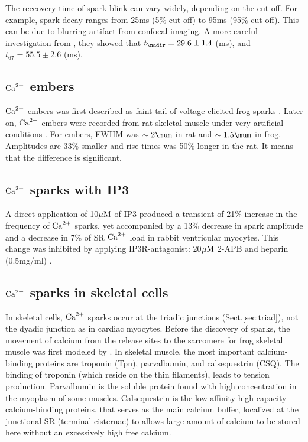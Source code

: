 The receovery time of spark-blink can vary widely, depending on the
cut-off. For example, spark decay ranges from 25ms (5\% cut off) to 95ms (95\%
cut-off). This can be due to blurring artifact from confocal imaging. A more
careful investigation from \citep{brochet2011}, they showed that
$t_\nadir=29.6\pm 1.4$ (ms), and $t_{67}=55.5\pm 2.6$ (ms).

\subsection{${\text{Ca}^{2+}}$ embers}

${\text{Ca}^{2+}}$ embers was first described as faint tail of voltage-elicited frog sparks
\citep{gonzalez2000}. Later on, ${\text{Ca}^{2+}}$ embers were recorded from rat skeletal
muscle under very artificial conditions \citep{zhou2003}.  For embers, FWHM was
$\sim 2\mum$ in rat and $\sim 1.5\mum$ in frog. Amplitudes are 33\% smaller and
rise times was 50\% longer in the rat. It means that the difference is
significant.


\subsection{${\text{Ca}^{2+}}$ sparks with IP3}

A direct application of 10${\mu\text{M}}$ of IP3 produced a transient of 21\% increase in
the frequency of ${\text{Ca}^{2+}}$ sparks, yet accompanied by a 13\% decrease in spark
amplitude and a decrease in 7\% of SR ${\text{Ca}^{2+}}$ load in rabbit ventricular myocytes.
This change was inhibited by applying IP3R-antagonist: 20${\mu\text{M}}$ 2-APB and
heparin (0.5mg/ml) \citep{domeier2008}.


\subsection{${\text{Ca}^{2+}}$ sparks in skeletal cells}
\label{sec:calcium-spark-skeletal-cell}

In skeletal cells, ${\text{Ca}^{2+}}$ sparks occur at the triadic junctions
(Sect.\ref{sec:triad}), not the dyadic junction as in cardiac myocytes. Before
the discovery of sparks, the movement of calcium from the release sites to the
sarcomere for frog skeletal muscle was first modeled by \citep{cannell1984}. In
skeletal muscle, the most important calcium-binding proteins are troponin (Tpn),
parvalbumin, and calsequestrin (CSQ). The binding of troponin (which reside on
the thin filaments), leads to tension production. Parvalbumin is the soluble
protein found with high concentration in the myoplasm of some muscles.
Calsequestrin is the low-affinity high-capacity calcium-binding proteins, that
serves as the main calcium buffer, localized at the junctional SR (terminal
cisternae) to allows large amount of calcium to be stored here without an
excessively high free calcium.


